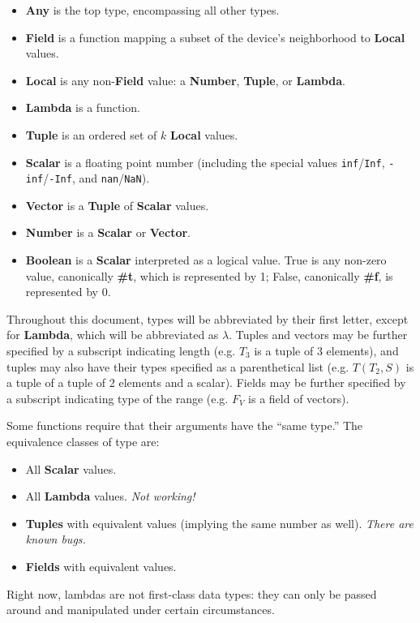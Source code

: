 \documentclass{article}
\newcommand\broken{{\em Not working!}}
\newcommand\bugs{{\em There are known bugs.}}
\newcommand\type[1]{$#1$}
\begin{document}
\begin{itemize}
\item {\bf Any} is the top type, encompassing all other types.
\item {\bf Field} is a function mapping a subset of the device's
  neighborhood to {\bf Local} values.
\item {\bf Local} is any non-{\bf Field} value: a {\bf Number}, 
  {\bf Tuple}, or {\bf Lambda}.
\item {\bf Lambda} is a function.
\item {\bf Tuple} is an ordered set of $k$ {\bf Local} values.
\item {\bf Scalar} is a floating point number (including the special
  values {\tt inf}/{\tt Inf}, {\tt -inf}/{\tt -Inf}, and {\tt nan}/{\tt NaN}).
\item {\bf Vector} is a {\bf Tuple} of {\bf Scalar} values.
\item {\bf Number} is a {\bf Scalar} or {\bf Vector}.
\item {\bf Boolean} is a {\bf Scalar} interpreted as a logical value.
  True is any non-zero value, canonically {\bf \#t}, which is
  represented by 1; False, canonically {\bf \#f}, is represented by 0.
\end{itemize}

Throughout this document, types will be abbreviated by their first
letter, except for {\bf Lambda}, which will be abbreviated as
$\lambda$.  Tuples and vectors may be further specified by a subscript
indicating length (e.g. \type{T_3} is a tuple of 3 elements), and
tuples may also have their types specified as a parenthetical list
(e.g. \type{T(T_2,S)} is a tuple of a tuple of 2 elements and a
scalar).  Fields may be further specified by a subscript indicating
type of the range (e.g. \type{F_V} is a field of vectors).

Some functions require that their arguments have the ``same type.''
The equivalence classes of type are:
\begin{itemize}
\item All {\bf Scalar} values.
\item All {\bf Lambda} values. \broken{}
\item {\bf Tuples} with equivalent values (implying the same number as
  well). \bugs{}
\item {\bf Fields} with equivalent values.
\end{itemize}

Right now, lambdas are not first-class data types: they can only be
passed around and manipulated under certain circumstances.
\end{document}
